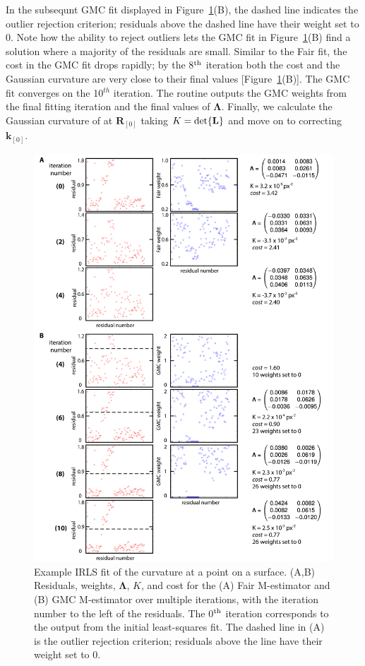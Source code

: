 In the subsequnt GMC fit displayed in Figure~\ref{f:3-IRLSexample}(B), the dashed line indicates the outlier rejection criterion; residuals above the dashed line have their weight set to 0.
Note how the ability to reject outliers lets the GMC fit in Figure~\ref{f:3-IRLSexample}(B) find a solution where a majority of the residuals are small.
Similar to the Fair fit, the cost in the GMC fit drops rapidly; by the 8$^{\rm th}$ iteration both the cost and the Gaussian curvature are very close to their final values [Figure~\ref{f:3-IRLSexample}(B)].
The GMC fit converges on the 10$^{th}$ iteration.
The routine outputs the GMC weights from the final fitting iteration and the final values of $\bm{\Lambda}$.
Finally, we calculate the Gaussian curvature of at $\mathbf{R}_{[0]}$ taking $K = \textup{det}\{ \mathbf{L} \}$ and move on to correcting $\mathbf{k}_{[0]}$.

\begin{figure}[H]
  \centering
  \includegraphics[scale=0.95]{figures/C3/Ch3-Figs_IRLSexample.png}
  \caption{Example IRLS fit of the curvature at a point on a surface.
  (A,B) Residuals, weights, $\bm{\Lambda}$, $K$, and cost for the (A) Fair M-estimator and (B) GMC M-estimator over multiple iterations, with the iteration number to the left of the residuals.
  The 0$^{\rm th}$ iteration corresponds to the output from the initial least-squares fit. The dashed line in (A) is the outlier rejection criterion; residuals above the line have their weight set to 0.}\label{f:3-IRLSexample}
\end{figure}

